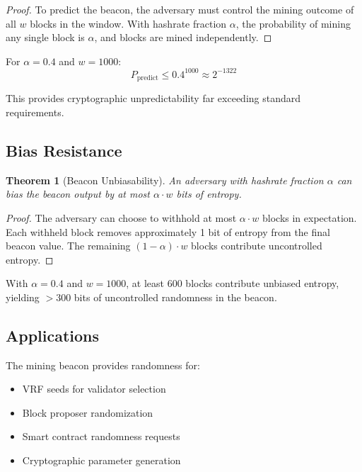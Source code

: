 \documentclass[11pt,a4paper]{article}
\newtheorem{theorem}{Theorem}[section]
\begin{document}
\begin{proof}
To predict the beacon, the adversary must control the mining outcome of all $w$ blocks in the window. With hashrate fraction $\alpha$, the probability of mining any single block is $\alpha$, and blocks are mined independently.
\end{proof}

For $\alpha = 0.4$ and $w = 1000$:
\begin{equation}
    P_{\text{predict}} \leq 0.4^{1000} \approx 2^{-1322}
\end{equation}

This provides cryptographic unpredictability far exceeding standard requirements.

\subsection{Bias Resistance}

\begin{theorem}[Beacon Unbiasability]
An adversary with hashrate fraction $\alpha$ can bias the beacon output by at most $\alpha \cdot w$ bits of entropy.
\end{theorem}

\begin{proof}
The adversary can choose to withhold at most $\alpha \cdot w$ blocks in expectation. Each withheld block removes approximately 1 bit of entropy from the final beacon value. The remaining $(1-\alpha) \cdot w$ blocks contribute uncontrolled entropy.
\end{proof}

With $\alpha = 0.4$ and $w = 1000$, at least 600 blocks contribute unbiased entropy, yielding $> 300$ bits of uncontrolled randomness in the beacon.

\subsection{Applications}

The mining beacon provides randomness for:
\begin{itemize}
    \item VRF seeds for validator selection
    \item Block proposer randomization
    \item Smart contract randomness requests
    \item Cryptographic parameter generation
\end{itemize}
\end{document}
